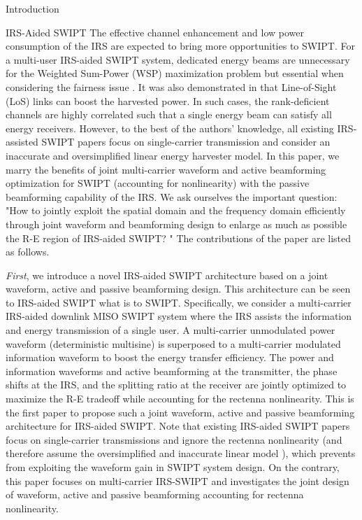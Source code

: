 \documentclass[journal]{IEEEtran}
\begin{document}
\begin{section}{Introduction}
		\begin{subsection}{IRS-Aided SWIPT}
			The effective channel enhancement and low power consumption of the IRS are expected to bring more opportunities to SWIPT. For a multi-user IRS-aided SWIPT system, dedicated energy beams are unnecessary for the Weighted Sum-Power (WSP) maximization problem \cite{Wu2020b} but essential when considering the fairness issue \cite{Tang2019}. It was also demonstrated in \cite{Wu2020a} that Line-of-Sight (LoS) links can boost the harvested power. In such cases, the rank-deficient channels are highly correlated such that a single energy beam can satisfy all energy receivers. However, to the best of the authors' knowledge, all existing IRS-assisted SWIPT papers focus on single-carrier transmission and consider an inaccurate and oversimplified linear energy harvester model. In this paper, we marry the benefits of joint multi-carrier waveform and active beamforming optimization for SWIPT (accounting for nonlinearity) with the passive beamforming capability of the IRS. We ask ourselves the important question: "How to jointly exploit the spatial domain and the frequency domain efficiently through joint waveform and beamforming design to enlarge as much as possible the R-E region of IRS-aided SWIPT? " The contributions of the paper are listed as follows.

			\textit{First}, we introduce a novel IRS-aided SWIPT architecture based on a joint waveform, active and passive beamforming design. This architecture can be seen to IRS-aided SWIPT what \cite{Clerckx2018b} is to SWIPT. Specifically, we consider a multi-carrier IRS-aided downlink MISO SWIPT system where the IRS assists the information and energy transmission of a single user. A multi-carrier unmodulated power waveform (deterministic multisine) is superposed to a multi-carrier modulated information waveform to boost the energy transfer efficiency. The power and information waveforms and active beamforming at the transmitter, the phase shifts at the IRS, and the splitting ratio at the receiver are jointly optimized to maximize the R-E tradeoff while accounting for the rectenna nonlinearity. This is the first paper to propose such a joint waveform, active and passive beamforming architecture for IRS-aided SWIPT. Note that existing IRS-aided SWIPT papers \cite{Wu2020b,Tang2019,Wu2020a,Pan2020} focus on single-carrier transmissions and ignore the rectenna nonlinearity (and therefore assume the oversimplified and inaccurate linear model \cite{Clerckx2019,Clerckx2016a}), which prevents from exploiting the waveform gain in SWIPT system design. On the contrary, this paper focuses on multi-carrier IRS-SWIPT and investigates the joint design of waveform, active and passive beamforming accounting for rectenna nonlinearity.


\end{subsection}
\end{section}
\end{document}
